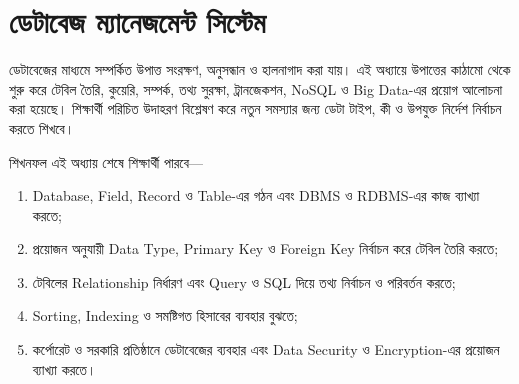 \ifdefined\chSixStandaloneLayout\else
  
  \chSixNarrowGeometry{\newgeometry}
\fi
\begingroup

\setlength{\headwidth}{\textwidth}
\setlength{\topsep}{2pt}
\setlength{\partopsep}{0pt}
\captionsetup{hypcap=false}
\setlength{\tabcolsep}{3pt}
\renewcommand{\arraystretch}{1.10}
\setlength{\abovedisplayskip}{4pt}
\setlength{\belowdisplayskip}{4pt}
\setlength{\abovedisplayshortskip}{2pt}
\setlength{\belowdisplayshortskip}{2pt}
\setcounter{secnumdepth}{2}
\setcounter{tocdepth}{1}
\setlength{\columnsep}{5mm}
\setlength{\parskip}{1pt}
\setlength{\multicolsep}{0pt}
\raggedcolumns
\let\chSixOriginalMulticols\multicols
\def\multicols{\par\nointerlineskip\chSixOriginalMulticols}
\setlength{\maxbalancingoverflow}{0pt}
\renewcommand{\tablename}{সারণি}
\chapter{ডেটাবেজ ম্যানেজমেন্ট সিস্টেম}

ডেটাবেজের মাধ্যমে সম্পর্কিত উপাত্ত সংরক্ষণ, অনুসন্ধান ও হালনাগাদ করা যায়। এই অধ্যায়ে উপাত্তের কাঠামো থেকে শুরু করে টেবিল তৈরি, কুয়েরি, সম্পর্ক, তথ্য সুরক্ষা, ট্রানজেকশন, NoSQL ও Big Data-এর প্রয়োগ আলোচনা করা হয়েছে। শিক্ষার্থী পরিচিত উদাহরণ বিশ্লেষণ করে নতুন সমস্যার জন্য ডেটা টাইপ, কী ও উপযুক্ত নির্দেশ নির্বাচন করতে শিখবে।

\begin{keypointbox}{শিখনফল}
এই অধ্যায় শেষে শিক্ষার্থী পারবে—
\begin{enumerate}
\item Database, Field, Record ও Table-এর গঠন এবং DBMS ও RDBMS-এর কাজ ব্যাখ্যা করতে;
\item প্রয়োজন অনুযায়ী Data Type, Primary Key ও Foreign Key নির্বাচন করে টেবিল তৈরি করতে;
\item টেবিলের Relationship নির্ধারণ এবং Query ও SQL দিয়ে তথ্য নির্বাচন ও পরিবর্তন করতে;
\item Sorting, Indexing ও সমষ্টিগত হিসাবের ব্যবহার বুঝতে;
\item কর্পোরেট ও সরকারি প্রতিষ্ঠানে ডেটাবেজের ব্যবহার এবং Data Security ও Encryption-এর প্রয়োজন ব্যাখ্যা করতে।
\end{enumerate}
\end{keypointbox}

